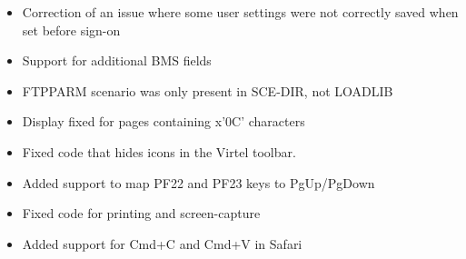\documentclass[letterpaper,10pt,english]{sphinxmanual}
\begin{document}
\begin{itemize}
\item {} 
Correction of an issue where some user settings were not correctly saved when set before sign-on

\end{itemize}

\begin{itemize}
\item {} 
Support for additional BMS fields

\end{itemize}

\begin{itemize}
\item {} 
FTPPARM scenario was only present in SCE-DIR, not LOADLIB

\end{itemize}

\begin{itemize}
\item {} 
Display fixed for pages containing x’0C’ characters

\end{itemize}

\begin{itemize}
\item {} 
Fixed code that hides icons in the Virtel toolbar.

\end{itemize}

\begin{itemize}
\item {} 
Added support to map PF22 and PF23 keys to PgUp/PgDown

\end{itemize}

\begin{itemize}
\item {} 
Fixed code for printing and screen-capture

\item {} 
Added support for Cmd+C and Cmd+V in Safari

\end{itemize}
\end{document}
